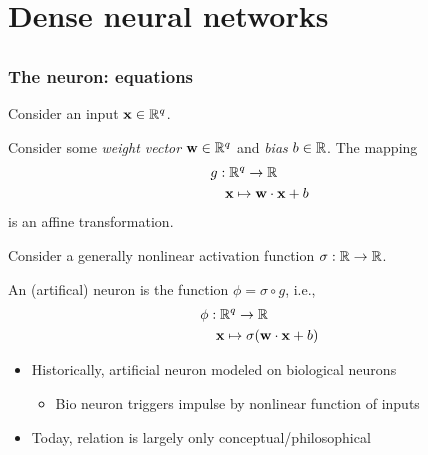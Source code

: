 \section{Dense neural networks}

\subsection{}

\begin{frame}
    \frametitle{The neuron: equations}

    Consider an input $\mathbf{x} \in \mathbb{R}^q$.
    \begin{block}{}
        Consider some \emph{weight vector} $\mathbf{w} \in \mathbb{R}^q$ and \emph{bias} $b \in \mathbb{R}$.
        The mapping
        \begin{align*}
            g &: \mathbb{R}^q \to \mathbb{R} \\
            &\hspace{1.25ex} \mathbf{x} \mapsto \mathbf{w} \cdot \mathbf{x} + b
        \end{align*}
        is an \alert{affine transformation}.
    \end{block}
    \pause

    Consider a generally nonlinear \alert{activation function} $\sigma: \mathbb{R} \to \mathbb{R}$.

    \begin{block}{}
        An (artifical) \alert{neuron} is the function $\phi = \sigma \circ g$, i.e.,
        \begin{align*}
            \phi &: \mathbb{R}^q \to \mathbb{R} \\
            &\hspace{1.25ex} \mathbf{x} \mapsto \sigma(\mathbf{w} \cdot \mathbf{x} + b)
        \end{align*}
    \end{block}
    \pause

    \begin{itemize}
        \item Historically, artificial neuron modeled on biological neurons
        \begin{itemize}
            \item Bio neuron triggers impulse by nonlinear function of inputs
        \end{itemize}
        \item Today, relation is largely only conceptual/philosophical
    \end{itemize}
\end{frame}

